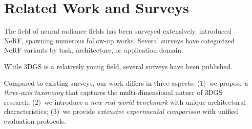 \section{Related Work and Surveys}
\label{sec:related}

The field of neural radiance fields has been surveyed extensively.
\cite{mildenhall2020nerf} introduced NeRF, spawning numerous follow-up
works. Several surveys have categorized NeRF variants by task,
architecture, or application domain.

While 3DGS is a relatively young field, several surveys have been
published. 

Compared to existing surveys, our work differs in three aspects:
(1)~we propose a \emph{three-axis taxonomy} that captures the
multi-dimensional nature of 3DGS research;
(2)~we introduce a \emph{new real-world benchmark} with unique
architectural characteristics;
(3)~we provide \emph{extensive experimental comparison} with unified
evaluation protocols.

